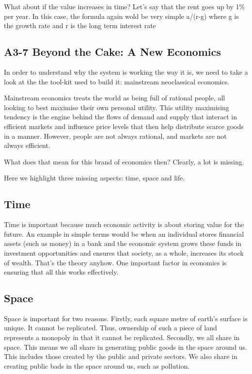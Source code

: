 \documentclass[]{tufte-handout}
\begin{document}
What about if the value increases in time? Let's say that the rent goes
up by 1\% per year. In this case, the formula again wold be very simple
a/(r-g) where g is the growth rate and r is the long term interest rate

\hypertarget{a3-7-beyond-the-cake-a-new-economics}{%
\subsection{A3-7 Beyond the Cake: A New
Economics}\label{a3-7-beyond-the-cake-a-new-economics}}

In order to understand why the system is working the way it is, we need
to take a look at the the tool-kit used to build it: mainstream
neoclassical economics.

Mainstream economics treats the world as being full of rational people,
all looking to best maximise their own personal utility. This utility
maximising tendency is the engine behind the flows of demand and supply
that interact in efficient markets and influence price levels that then
help distribute scarce goods in a manner. However, people are not always
rational, and markets are not always efficient.

What does that mean for this brand of economics then? Clearly, a lot is
missing.

Here we highlight three missing aspects: time, space and life.

\hypertarget{time}{%
\subsection{Time}\label{time}}

Time is important because much economic activity is about storing value
for the future. An example in simple terms would be when an individual
stores financial assets (such as money) in a bank and the economic
system grows these funds in investment opportunities and ensures that
society, as a whole, increases its stock of wealth. That's the theory
anyhow. One important factor in economics is ensuring that all this
works effectively.

\hypertarget{space}{%
\subsection{Space}\label{space}}

Space is important for two reasons. Firstly, each square metre of
earth's surface is unique. It cannot be replicated. Thus, ownership of
such a piece of land represents a monopoly in that it cannot be
replicated. Secondly, we all share in space. This means we all share in
generating public goods in the space around us. This includes those
created by the public and private sectors. We also share in creating
public bads in the space around us, such as pollution.
\end{document}

